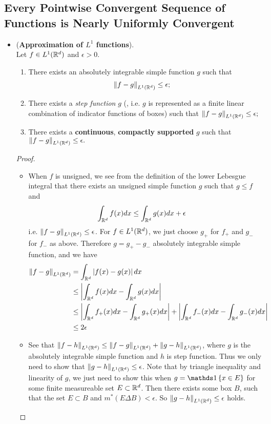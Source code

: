 \documentclass[11pt]{article}
\begin{document}
\subsection{Every Pointwise Convergent Sequence of Functions is Nearly Uniformly Convergent}
\begin{itemize}
\item \begin{theorem} (\textbf{Approximation of $L^1$ functions}).\\
Let $f \in L^1({\mathbb R}^d)$ and $\epsilon > 0$.
\begin{enumerate}
\item There exists an absolutely integrable simple function $g$ such that
\begin{align*}
\left\|f- g\right\|_{ L^1({\mathbb R}^d)} &\le \epsilon; 
\end{align*}
\item There exists a \emph{step function} $g$ (, i.e. $g$ is represented as a finite linear combination of indicator functions of boxes) such that $\left\|f- g\right\|_{ L^1({\mathbb R}^d)} \le \epsilon; $
\item There exists a \textbf{continuous}, \textbf{compactly supported} $g$ such that $\left\|f- g\right\|_{ L^1({\mathbb R}^d)} \le \epsilon.$
\end{enumerate}
\end{theorem}
\begin{proof} 
\begin{itemize}
\item When $f$ is unsigned, we see from the definition of the lower Lebesgue integral that there exists an unsigned
simple function $g$ such that $g \le f$ and 
\begin{align*}
\int_{{\mathbb R}^{d}}f(x)dx  &\le \int_{{\mathbb R}^{d}}g(x)dx +\epsilon
\end{align*} i.e. $\left\|f- g\right\|_{ L^1({\mathbb R}^d)}\le \epsilon$.
For $f\in L^1({\mathbb R}^d) $, we just choose $g_{+}$ for $f_{+}$ and $g_{-}$ for $f_{-}$ as above. Therefore $g= g_{+}- g_{-}$  absolutely integrable simple function, and we have 
\begin{align*}
\left\|f- g\right\|_{ L^1({\mathbb R}^d)} &= \int_{{\mathbb R}^{d}}\left\lvert f(x)- g(x) \right\rvert dx \\
&\le \left\lvert \int_{{\mathbb R}^{d}}f(x)dx - \int_{{\mathbb R}^{d}}g(x)dx \right\rvert\\
&\le  \left\lvert \int_{{\mathbb R}^{d}}f_{+}(x)dx - \int_{{\mathbb R}^{d}}g_{+}(x)dx \right\rvert+ \left\lvert \int_{{\mathbb R}^{d}}f_{-}(x)dx - \int_{{\mathbb R}^{d}}g_{-}(x)dx \right\rvert\\
&\le 2\epsilon
\end{align*}
\item See that $\left\|f- h\right\|_{ L^1({\mathbb R}^d)} \le \left\|f- g\right\|_{ L^1({\mathbb R}^d)} + \left\|g- h\right\|_{ L^1({\mathbb R}^d)}  $, where $g$ is the absolutely integrable simple function and $h$ is step function. Thus we only need to show that $\left\|g- h\right\|_{ L^1({\mathbb R}^d)}\le \epsilon$. Note that by triangle inequality and linearity of $g$, we just need to show this when $g = \ind{x\in E}$ for some finite measureable set $E\subset {\mathbb R}^{d}$. Then there exists some box $B$, such that the set $E\subset B$ and $m^{*}(E\Delta B)<\epsilon$. So $\left\|g- h\right\|_{ L^1({\mathbb R}^d)}\le \epsilon$ holds.   

\end{itemize}
\end{proof}
\end{itemize}
\end{document}
